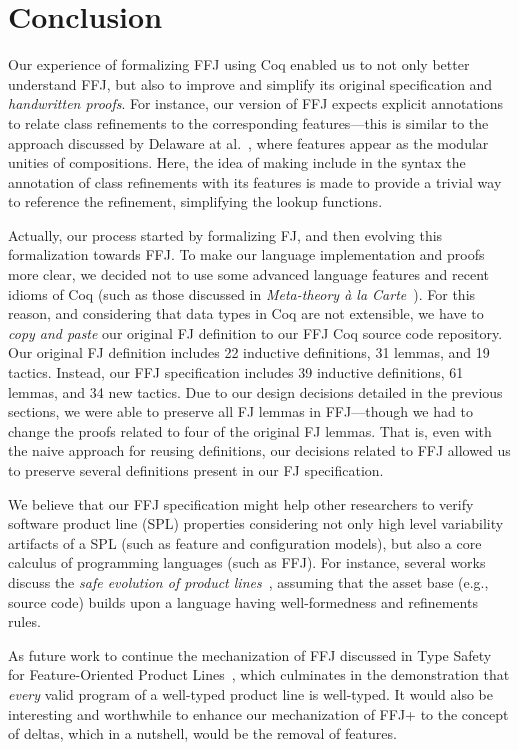 \chapter{Conclusion}\label{chap:conclusion}

Our experience of formalizing \gls{FFJ} 
using Coq enabled us to 
not only better understand \gls{FFJ}, but also to improve and 
simplify its original specification and \emph{handwritten 
proofs}. For instance, our version of \gls{FFJ} expects 
explicit annotations to relate class refinements to the 
corresponding features---this is similar to the 
approach discussed by Delaware at al.~\cite{delaware:fse-2009}, 
where features appear as the modular unities of compositions. 
Here, the idea of making include in the syntax the annotation 
of class refinements with its features is made to provide a trivial way to 
reference the refinement, simplifying the lookup functions.

Actually, our process started by formalizing \gls{FJ}, 
and then evolving this formalization towards \gls{FFJ}. 
To make our language implementation and proofs more clear, 
we decided not to use some advanced language features 
and recent idioms of Coq (such as those discussed in \emph{Meta-theory \`{a} la Carte}~\cite{delaware:popl2013}). 
For this reason, and considering that data types in Coq are not extensible, 
we have to \emph{copy and paste} our original \gls{FJ} definition 
to our \gls{FFJ} Coq source code repository. Our original \gls{FJ} 
definition includes 22 inductive definitions, 31 lemmas, and 
19 tactics. Instead, our \gls{FFJ} specification includes 
39 inductive definitions, 61 lemmas, and 34 new tactics. Due to our 
design decisions detailed in the previous sections, 
we were able to preserve all \gls{FJ} lemmas in \gls{FFJ}---though 
we had to change the proofs related to four of the original \gls{FJ} 
lemmas. That is, even with the naive approach for reusing 
definitions, our decisions related to \gls{FFJ} 
allowed us to preserve several definitions present 
in our \gls{FJ} specification. 

We believe that our \gls{FFJ} specification might 
help other researchers to verify software product 
line (SPL) properties considering not only high level 
variability artifacts of a SPL (such as feature and configuration 
models), but also a core calculus of programming 
languages (such as \gls{FFJ}). For instance, 
several works discuss the \emph{safe evolution 
of product lines}~\cite{neves2012investigating}, assuming that the asset 
base (e.g., source code) builds upon a 
language having well-formedness and 
refinements rules.  

As future work to continue the mechanization of \gls{FFJ} discussed in 
Type Safety for Feature-Oriented Product Lines~\cite{apel2010type}, which culminates
in the demonstration that \emph{every} valid program of a well-typed product
line is well-typed. It would also be interesting and worthwhile to enhance our
mechanization of \gls{FFJ+} to the concept of deltas, which in a nutshell,
would be the removal of features.
